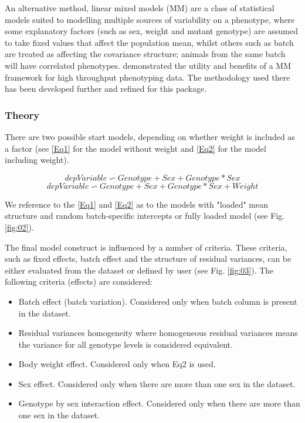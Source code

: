 \documentclass[12pt,a4paper]{article}
\begin{document}
An alternative method, linear mixed models (MM) are a class of statistical models suited to modelling multiple sources of variability on a phenotype, where some explanatory factors (such as sex, weight and mutant genotype) are assumed to take fixed values that affect the population mean, whilst others such as batch are treated as affecting the covariance structure; animals from the same batch will have correlated phenotypes. \cite{MM12} demonstrated the utility and benefits of a MM framework for high throughput phenotyping data. The methodology used there has been developed further and refined for this package. 

\subsubsection{Theory}
There are two possible start models, depending on whether weight is included as a factor (see \ref{Eq1} for the model without weight and \ref{Eq2} for the model including weight).

\[
depVariable \backsim Genotype + Sex +
Genotype*Sex \tag{Eq1}\label{Eq1}
\]
\[
depVariable \backsim Genotype + Sex +
Genotype*Sex + Weight \tag{Eq2}\label{Eq2}
\]

We reference to the \ref{Eq1} and \ref{Eq2} as to the models with "loaded" mean structure and random batch-specific intercepts or fully loaded model (see Fig. \ref{fig:02}).

The final model construct is influenced by a number of criteria. 
These criteria, such as fixed effects, batch effect and the structure of residual variances, can be either evaluated from the dataset or defined by user (see Fig. \ref{fig:03}).
The following criteria (effects) are considered:
\begin{itemize}
\item Batch effect (batch variation). Considered only when batch column is present in the dataset. 
\item Residual variances homogeneity where homogeneous residual variances means the variance for all genotype levels is considered equivalent.
\item Body weight effect. Considered only when Eq2 is used.
\item Sex effect. Considered only when there are more than one sex in the dataset. 
\item Genotype by sex interaction effect. Considered only when there are more than one sex in the dataset. 
\end{itemize}
\end{document}
